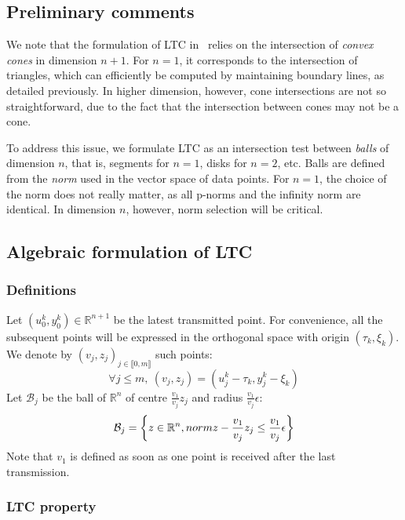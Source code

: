 \documentclass{report}
\begin{document}
\subsection{Preliminary comments}

We note that the formulation of LTC 
in~\cite{schoellhammer2004lightweight} relies on the intersection of 
\emph{convex cones} in dimension $n+1$. For $n=1$, it corresponds to 
the intersection of triangles, which can efficiently be computed by 
maintaining boundary lines, as detailed previously. In higher 
dimension, however, cone intersections are not so straightforward, due 
to the fact that the intersection between cones may not be a cone.

To address this issue, we formulate LTC as an intersection test between
\emph{balls} of dimension $n$, that is, segments for $n=1$, disks for
$n=2$, etc. Balls are defined from the \emph{norm} used in
the vector space of data points. For $n=1$, the choice of the norm does
not really matter, as all p-norms and the infinity norm are identical.
In dimension $n$, however, norm selection will be critical.

\subsection{Algebraic formulation of LTC}

\subsubsection{Definitions}

Let $(u_0^k, y_0^k) \in \mathbb{R}^{n+1}$ be the latest transmitted point. For convenience, all the subsequent points will be
expressed in the orthogonal space with origin $(\tau_k, \xi_k)$. We denote by $(v_j, z_j)_{j \in \llbracket 0, m \rrbracket}$ such points:
\begin{equation*}
\forall j \leq m,\  (v_j, z_j) = (u_j^k - \tau_k, y_j^k - \xi_k)
\end{equation*}
Let $\mathcal{B}_j$ be the ball of $\mathbb{R}^n$ of centre $\frac{v_1}{v_j}z_j$ and radius
$\frac{v_1}{v_j}\epsilon$:
\begin{equation*}
\mathcal{B}_j = \left\{ z \in \mathbb{R}^n,\\norm{z-\frac{v_1}{v_j}z_j} \leq\frac{v_1}{v_j}\epsilon \right\}
\end{equation*}
Note that $v_1$ is defined as soon as one point is received after the last
transmission.

\subsubsection{LTC property}
\end{document}
